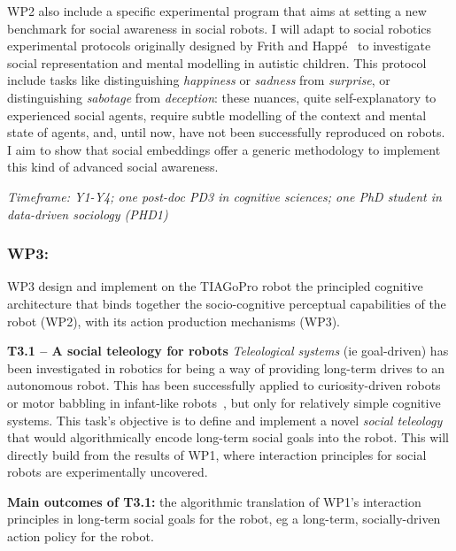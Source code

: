 WP2 also include a specific experimental program that aims at setting a new
benchmark for social awareness in social robots. I will adapt to social
robotics~\cite{lemaignan2015mutual} experimental protocols originally designed
by Frith and Happé~\cite{frith1994autism} to investigate social representation
and mental modelling in autistic children.  This protocol include tasks like
distinguishing \emph{happiness} or \emph{sadness} from \emph{surprise}, or
distinguishing \emph{sabotage} from \emph{deception}: these nuances, quite
self-explanatory to experienced social agents, require subtle modelling of the
context and mental state of agents, and, until now, have not been successfully
reproduced on robots. I aim to show that social embeddings offer a generic
methodology to implement this kind of advanced social awareness.


\vspace{1em}
\noindent\emph{Timeframe: Y1-Y4; one post-doc PD3 in cognitive sciences; one PhD student in data-driven sociology (PHD1)}




\subsubsection{WP3: \textbf{\wpThree}}

WP3 design and implement on the TIAGoPro robot the principled cognitive architecture
that binds together the socio-cognitive perceptual capabilities of the robot
(WP2), with its action production mechanisms (WP3).

\textbf{T3.1 -- A social teleology for robots}
\emph{Teleological systems} (ie goal-driven) has been investigated in robotics
for being a way of providing long-term drives to an autonomous robot. This has
been successfully applied to curiosity-driven robots~\cite{oudeyer2005playground} or motor babbling in infant-like
robots~\cite{forestier2017unified}, but only for relatively simple cognitive
systems. This task's objective is to define and implement a novel \emph{social teleology} that would
algorithmically encode long-term social goals into the robot. This will directly
build from the results of WP1, where interaction principles for social robots
are experimentally uncovered.

\begin{framed}
    {\noindent\bf Main outcomes of T3.1:} the algorithmic translation of WP1's
    interaction principles in long-term social goals for the robot, eg a
    long-term, socially-driven action policy for the robot.
\end{framed}


